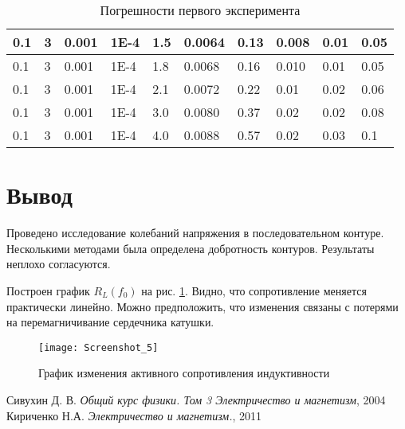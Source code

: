 \documentclass[a4paper]{article}
\begin{document}
\begin{table}[h]
\begin{tabular}{|l|l|l|l|l|l|l|l|l|l|}
		0.1                & 3                      & 0.001             & 1E-4          & 1.5              & 0.0064     & 0.13              & 0.008                   & 0.01               & 0.05           \\ \hline
		0.1                & 3                      & 0.001             & 1E-4          & 1.8              & 0.0068     & 0.16              & 0.010                   & 0.01               & 0.05           \\ \hline
		0.1                & 3                      & 0.001             & 1E-4          & 2.1              & 0.0072     & 0.22              & 0.01                    & 0.02               & 0.06           \\ \hline
		0.1                & 3                      & 0.001             & 1E-4          & 3.0              & 0.0080     & 0.37              & 0.02                    & 0.02               & 0.08           \\ \hline
		0.1                & 3                      & 0.001             & 1E-4          & 4.0              & 0.0088     & 0.57              & 0.02                    & 0.03               & 0.1            \\ \hline
	\end{tabular}
	\caption{Погрешности первого эксперимента}
	\label{погр}
\end{table}

\section{Вывод}
Проведено исследование колебаний напряжения в последовательном контуре. Несколькими методами была определена добротность контуров. Результаты неплохо согласуются.

Построен график $ R_L (f_0) $ на рис. \ref{ind}. Видно, что сопротивление меняется практически линейно. Можно предположить, что изменения связаны с потерями на перемагничивание сердечника катушки. 

 
\begin{figure}
	\centering
	\texttt{[image: Screenshot\_5]}
	\caption{График изменения активного сопротивления индуктивности}
	\label{ind}
\end{figure}


\begin{thebibliography}{9}
 Сивухин Д. В. \emph{Общий курс физики. Том 3 Электричество и магнетизм}, 2004
 Кириченко Н.А. \emph{Электричество и магнетизм.}, 2011
\end{thebibliography}
\end{document}

